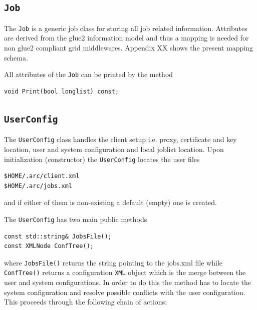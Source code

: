 \documentclass{book}
\newcommand{\Job}{\texttt{Job}}
\newcommand{\UserConfig}{\texttt{UserConfig}}
\newcommand{\XML}{\texttt{XML}}
\begin{document}
\subsection{{\Job}} The {\Job} is a generic job class for storing all job related information. Attributes are derived from the 
glue2 information model and thus a mapping is needed for non glue2 compliant grid middlewares. Appendix XX shows the present 
mapping schema.

All attributes of the {\Job} can be printed by the method

\begin{shaded}
\begin{verbatim}                                                                                                                            
void Print(bool longlist) const;
\end{verbatim}
\end{shaded}

\subsection{{\UserConfig}} The {\UserConfig} class handles the client setup i.e. proxy, certificate and key location, user and system 
configuration and local joblist location. Upon initialization (constructor) the {\UserConfig} locates the user files

\begin{shaded}
\begin{verbatim}                                                                                                                            
$HOME/.arc/client.xml
$HOME/.arc/jobs.xml
\end{verbatim}
\end{shaded}

and if either of them is non-existing a default (empty) one is created.

The {\UserConfig} has two main public methods

\begin{shaded}
\begin{verbatim}
const std::string& JobsFile();
const XMLNode ConfTree();
\end{verbatim}
\end{shaded}

where \texttt{JobsFile()} returns the string pointing to the jobs.xml file while \texttt{ConfTree()}
returns a configuration {\XML} object which is the merge between the user and system configurations.
In order to do this the method has to locate the system configuration and resolve possible conflicts 
with the user configuration. This proceeds through the following chain of actions:
\end{document}
